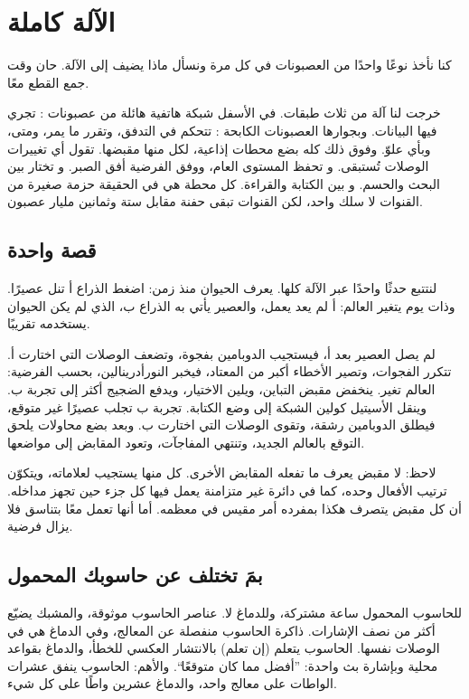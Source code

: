 \chapter{الآلة كاملة}


كنا نأخذ نوعًا واحدًا من العصبونات في كل مرة ونسأل ماذا يضيف إلى الآلة. حان وقت جمع القطع معًا.

خرجت لنا آلة من ثلاث طبقات. في الأسفل شبكة هاتفية هائلة من عصبونات : تجري فيها البيانات. وبجوارها العصبونات الكابحة : تتحكم في التدفق، وتقرر ما يمر، ومتى، وبأي علوّ. وفوق ذلك كله بضع محطات إذاعية، لكل منها مقبضها.  تقول أي تغييرات الوصلات تُستبقى. و تحفظ المستوى العام، ووفق الفرضية أفق الصبر. و تختار بين البحث والحسم. و بين الكتابة والقراءة. كل محطة هي في الحقيقة حزمة صغيرة من القنوات لا سلك واحد، لكن القنوات تبقى حفنة مقابل ستة وثمانين مليار عصبون.

\section*{قصة واحدة}

لنتتبع حدثًا واحدًا عبر الآلة كلها. يعرف الحيوان منذ زمن: اضغط الذراع أ تنل عصيرًا. وذات يوم يتغير العالم: أ لم يعد يعمل، والعصير يأتي به الذراع ب، الذي لم يكن الحيوان يستخدمه تقريبًا.

لم يصل العصير بعد أ، فيستجيب الدوبامين بفجوة، وتضعف الوصلات التي اختارت أ. تتكرر الفجوات، وتصير الأخطاء أكبر من المعتاد، فيخبر النورأدرينالين، بحسب الفرضية: العالم تغير. ينخفض مقبض التباين، ويلين الاختيار، ويدفع الضجيج أكثر إلى تجربة ب. وينقل الأسيتيل كولين الشبكة إلى وضع الكتابة. تجربة ب تجلب عصيرًا غير متوقع، فيطلق الدوبامين رشقة، وتقوى الوصلات التي اختارت ب. وبعد بضع محاولات يلحق التوقع بالعالم الجديد، وتنتهي المفاجآت، وتعود المقابض إلى مواضعها.

لاحظ: لا مقبض يعرف ما تفعله المقابض الأخرى. كل منها يستجيب لعلاماته، ويتكوّن ترتيب الأفعال وحده، كما في دائرة غير متزامنة يعمل فيها كل جزء حين تجهز مداخله. أن كل مقبض يتصرف هكذا بمفرده أمر مقيس في معظمه. أما أنها تعمل معًا بتناسق فلا يزال فرضية.

\section*{بمَ تختلف عن حاسوبك المحمول}

للحاسوب المحمول ساعة مشتركة، وللدماغ لا. عناصر الحاسوب موثوقة، والمشبك يضيّع أكثر من نصف الإشارات. ذاكرة الحاسوب منفصلة عن المعالج، وفي الدماغ هي في الوصلات نفسها. الحاسوب يتعلم (إن تعلم) بالانتشار العكسي للخطأ، والدماغ بقواعد محلية وبإشارة بث واحدة: ”أفضل مما كان متوقعًا“. والأهم: الحاسوب ينفق عشرات الواطات على معالج واحد، والدماغ عشرين واطًا على كل شيء.

